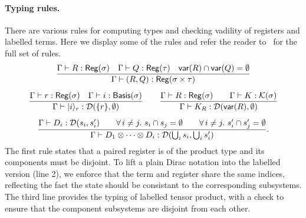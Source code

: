 \paragraph*{Typing rules.}
There are various rules for computing types and checking vadility of
registers and labelled terms. Here we display some of the rules and
refer the reader to~ for the full set of rules.
\begin{gather*}
  \frac{
      \Gamma \vdash R : \mathsf{Reg}(\sigma) \quad
      \Gamma \vdash Q : \mathsf{Reg}(\tau)
      \quad \mathsf{var}(R) \cap \mathsf{var}(Q) = \emptyset
  }{\Gamma \vdash (R,Q) : \mathsf{Reg}(\sigma \times \tau)} \\[0.2cm]
  \frac{
          \Gamma \vdash r : \mathsf{Reg}(\sigma) \quad
          \Gamma \vdash i : \mathsf{Basis}(\sigma)}
  {\Gamma \vdash |i\rangle_r : \mathcal{D}(\{r\}, \emptyset)}
  \qquad
  \frac{\Gamma \vdash R : \mathsf{Reg}(\sigma)\qquad \Gamma \vdash K : \mathcal{K}(\sigma)}{\Gamma \vdash K_R : \mathcal{D}(\mathsf{var}(R), \emptyset)} \\[0.2cm]
    \frac{
        \Gamma \vdash D_i : \mathcal{D}(s_i,s_i') \qquad
        \forall\,i\neq j.\ s_i\cap s_j = \emptyset \qquad
        \forall\,i\neq j.\ s'_i\cap s'_j = \emptyset
    }
    {\Gamma \vdash D_1 \otimes \cdots \otimes D_i : \mathcal{D}(\bigcup_i s_i, \bigcup_i s_i')}.
\end{gather*}
The first rule states that a paired register is of the product type and its components must be disjoint.
To lift a plain Dirac notation into the labelled version (line 2), we enforce that the term and register share the same indices, reflecting the fact the state should be consistant to the corresponding subsystems.
The third line provides the typing of labelled tensor product, with a check to ensure that the component subsystems are disjoint from each other.


